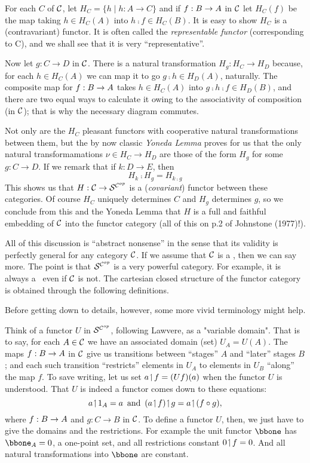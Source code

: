 For each $C$ of $\mathcal C$, let $H_C = \{ h \mid h: A \to C \}$ and if $f: B \rightarrow A$ in $\mathcal C$ let $H_C(f)$ be the map taking $h \in H_C(A)$ into $h \comp f \in H_C(B)$.
It is easy to show $H_C$ is a (contravariant) functor. It is often called the {\it representable functor} (corresponding to C), and we shall see that it is very ``representative''.

Now let $g: C \to D$ in $\mathcal C$. There is a natural transformation
$H_g: H_C \to H_D$ because, for each $h \in H_C(A)$ we can map it to go $g \comp h \in H_D(A)$, naturally. The composite map for $f : B \rightarrow A$
takes $h \in H_C(A)$ into $g \comp h \comp f \in H_D(B)$, and there are two equal
ways to calculate it owing to the associativity of composition (in $\mathcal C$); that is why the necessary diagram commutes.

Not only are the $H_C$ pleasant functors with cooperative natural transformations between them, but the by now classic {\it Yoneda Lemma}
proves for us that the only natural transformamations $\nu \in H_C \to H_D$
are those of the form $H_g$ for some $g: C\to D$. If we remark that if $k:D\to E$, then
$$
H_k \comp H_g = H_{k \comp g}
$$
%
This shows us that $H : \mathcal C \rightarrow \mathcal S^{\mathcal C^{op}}$ is a ({\it covariant}) functor between these categories.
Of course $H_C$ uniquely determines $C$ and
$H_g$ determines $g$, so we conclude from this and the Yoneda Lemma that $H$ is a full and faithful embedding of $\mathcal C$ into the functor
category (all of this on p.2 of Johnstone (1977)!).

All of this discussion is ``abstract nonsense'' in the sense that its validity is perfectly general for any category $\mathcal C$. If we assume that $\mathcal C$ is a \ccc, then we can say more. The point is that $\mathcal S^{\mathcal C^{op}}$ is a very powerful category. For example, it is
always a \ccc\  even if $\mathcal C$ is not. The cartesian closed structure of the functor category is obtained through the following definitions.

Before getting down to details, however, some more vivid terminology might help.

Think of a functor $U$ in $\mathcal S^{\mathcal C^{op}}$, following Lawvere, as a "variable domain".  That is to say, for each $A \in \mathcal C$ we have an associated domain (set) $U_A = U(A)$. The maps $f:B \rightarrow A$ in $\mathcal C$ give us transitions between ``stages'' $A$ and ``later'' stages $B$; and each such transition ``restricts'' elements in
$U_A$ to elements in $U_B$ ``along'' the map $f$. To save writing, let us set $a \!\upharpoonleft\! f = (Uf)(a)$ when the functor $U$ is understood. That $U$ is indeed a functor comes down to these equations:
$$
a \res \id_A = a \,\textrm{ and }\, (a \res f) \res g = a \res (f \comp g),
$$
where  $f : B \rightarrow A$ and $g: C\to B$ in $\mathcal C$. To define a functor $U$, then, we just have to give the domains and the restrictions.
For example the unit functor $\bbone$ has $\bbone_A = {0}$, a one-point set, and all restrictions constant $0 \!\upharpoonleft\! f = 0$. And all natural transformations into $\bbone$ are constant.


